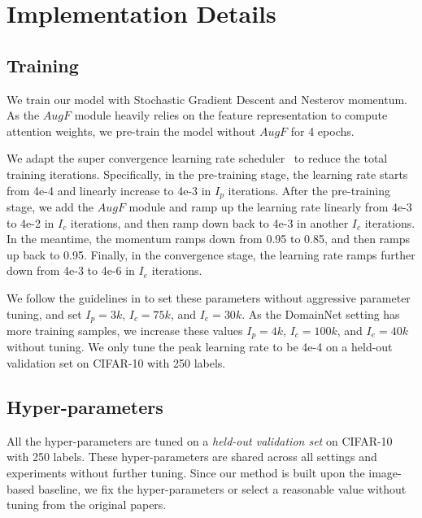 \documentclass[runningheads]{llncs}
\begin{document}
\section{Implementation Details}
\subsection{Training}
We train our model with Stochastic Gradient Descent and Nesterov momentum.
As the $AugF$ module heavily relies on the feature representation to compute attention weights, we pre-train the model without $AugF$ for 4 epochs.

We adapt the super convergence learning rate scheduler~\cite{smith2019super} to reduce the total training iterations.
Specifically, in the pre-training stage, the learning rate starts from 4e-4 and linearly increase to 4e-3 in $I_p$ iterations.
After the pre-training stage, we add the $AugF$ module and ramp up the learning rate linearly from 4e-3 to 4e-2 in $I_c$ iterations, and then ramp down back to 4e-3 in another $I_c$ iterations.
In the meantime, the momentum ramps down from 0.95 to 0.85, and then ramps up back to 0.95.
Finally, in the convergence stage, the learning rate ramps further down from 4e-3 to 4e-6 in $I_e$ iterations.

We follow the guidelines in \cite{smith2019super} to set these parameters without aggressive parameter tuning, and set $I_p=3k$, $I_c=75k$, and $I_e=30k$.
As the DomainNet setting has more training samples, we increase these values $I_p=4k$, $I_c=100k$, and $I_e=40k$ without tuning.
We only tune the peak learning rate to be 4e-4 on a held-out validation set on CIFAR-10 with 250 labels.


\subsection{Hyper-parameters}

All the hyper-parameters are tuned on a \emph{held-out validation set} on CIFAR-10 with 250 labels.
These hyper-parameters are shared across all settings and experiments without further tuning.
Since our method is built upon the image-based baseline, we fix the hyper-parameters or select a reasonable value without tuning from the original papers.
\end{document}
